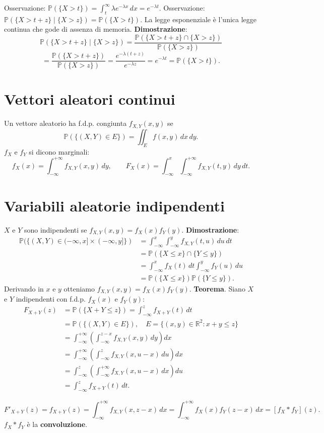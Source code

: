 \documentclass[11pt,a4paper]{article}
\newcommand{\pagina}[1]{\clearpage}
\begin{document}
Osservazione: $\mathbb P(\{X>t\})=\int_t^\infty\lambda e^{-\lambda x}\,dx=e^{-\lambda t}$.
Osservazione: $\mathbb P(\{X>t+z\}\mid\{X>z\})=\mathbb P(\{X>t\})$.
La legge esponenziale è l'unica legge continua che gode di assenza di memoria.
\textbf{Dimostrazione}:
\[\mathbb P(\{X>t+z\}\mid\{X>z\})=\frac{\mathbb P(\{X>t+z\}\cap\{X>z\})}{\mathbb P(\{X>z\})}\]\[=\frac{\mathbb P(\{X>t+z\})}{\mathbb P(\{X>z\})}=\frac{e^{-\lambda(t+z)}}{e^{-\lambda z}}=e^{-\lambda t}=\mathbb P(\{X>t\}).\]
\section*{Vettori aleatori continui}
Un vettore aleatorio ha f.d.p. congiunta $f_{X,Y}(x,y)$ se
\pagina{30}\[\mathbb P(\{(X,Y)\in E\})=\iint_E f(x,y)\,dx\,dy.\]
$f_X$ e $f_Y$ si dicono marginali:
\[f_X(x)=\int_{-\infty}^{+\infty}f_{X,Y}(x,y)\,dy,\qquad F_X(x)=\int_{-\infty}^x\int_{-\infty}^{+\infty}f_{X,Y}(t,y)\,dy\,dt.\]
\section*{Variabili aleatorie indipendenti}
$X$ e $Y$ sono indipendenti se $\boxed{f_{X,Y}(x,y)=f_X(x)f_Y(y)}$.
\textbf{Dimostrazione}:
\begin{align*}
\mathbb P(\{(X,Y)\in(-\infty,x]\times(-\infty,y]\})&=\int_{-\infty}^x\int_{-\infty}^y f_{X,Y}(t,u)\,du\,dt\\
&=\mathbb P(\{X\le x\}\cap\{Y\le y\})\\
&=\int_{-\infty}^xf_X(t)\,dt\int_{-\infty}^yf_Y(u)\,du\\
&=\mathbb P(\{X\le x\})\mathbb P(\{Y\le y\}).
\end{align*}
Derivando in $x$ e $y$ otteniamo $f_{X,Y}(x,y)=f_X(x)f_Y(y)$.
\textbf{Teorema}. Siano $X$ e $Y$ indipendenti con f.d.p. $f_X(x)$ e $f_Y(y)$:
\begin{align*}
F_{X+Y}(z)&=\mathbb P(\{X+Y\le z\})=\int_{-\infty}^z f_{X+Y}(t)\,dt\\
&=\mathbb P(\{(X,Y)\in E\}),\quad E=\{(x,y)\in\mathbb R^2:x+y\le z\}\\
&=\int_{-\infty}^{+\infty}\left(\int_{-\infty}^{z-x}f_{X,Y}(x,y)\,dy\right)dx\\
&=\int_{-\infty}^{+\infty}\left(\int_{-\infty}^{z}f_{X,Y}(x,u-x)\,du\right)dx\\
&=\int_{-\infty}^z\left(\int_{-\infty}^{+\infty}f_{X,Y}(x,u-x)\,dx\right)du\\
&=\int_{-\infty}^z f_{X+Y}(t)\,dt.
\end{align*}
\begin{center}\end{center}
\[F'_{X+Y}(z)=\boxed{f_{X+Y}(z)}=\int_{-\infty}^{+\infty}f_{X,Y}(x,z-x)\,dx=\boxed{\int_{-\infty}^{+\infty}f_X(x)f_Y(z-x)\,dx}=[f_X*f_Y](z).\]
$f_X*f_Y$ è la \textbf{convoluzione}.


\end{document}
